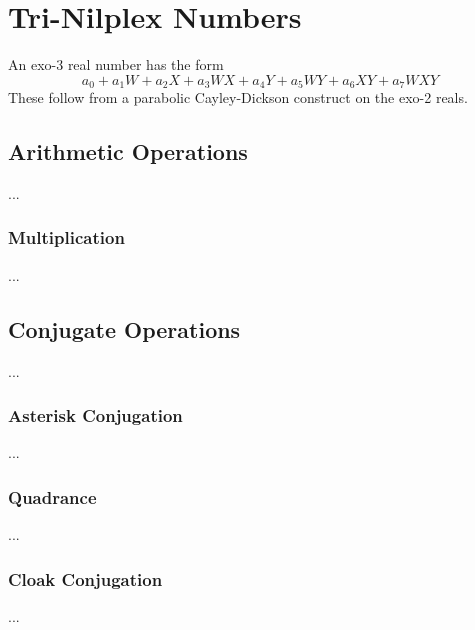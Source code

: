 \chapter{Tri-Nilplex Numbers}
An exo-3 real number has the form
\begin{equation}
    a_{0} + a_{1} W + a_{2} X + a_{3} WX + a_{4} Y + a_{5} WY + a_{6} XY + a_{7} WXY
\end{equation}
These follow from a parabolic Cayley-Dickson construct on the exo-2 reals.
\section{Arithmetic Operations}
...
\subsection{Multiplication}
...
\section{Conjugate Operations}
...
\subsection{Asterisk Conjugation}
...
\subsection{Quadrance}
...
\subsection{Cloak Conjugation}
...
